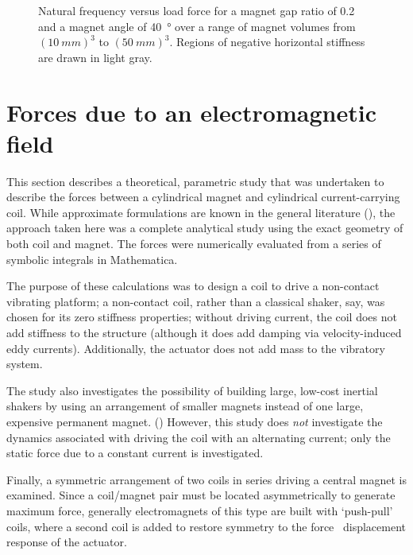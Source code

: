 \begin{figure}
\centering
{}
\caption{Natural frequency versus load force for a magnet gap ratio of \num{0.2} and a magnet angle of \SI{40}{\degree} over a range of magnet volumes from $(\SI{10}{mm})^3$ to $(\SI{50}{mm})^3$. Regions of negative horizontal stiffness are drawn in light gray.}
\end{figure}




\section{Forces due to an electromagnetic field}

This section describes a theoretical, parametric study that was undertaken to
describe the forces between a cylindrical magnet and cylindrical
current-carrying coil. While approximate formulations are known in the general
literature (), the approach taken here was a complete
analytical study using the exact geometry of both coil and magnet. The
forces were numerically evaluated from a series of symbolic integrals in
Mathematica.

The purpose of these calculations was to design a coil to drive a non-contact
vibrating platform; a non-contact coil, rather than a classical shaker, say,
was chosen for its zero stiffness properties; without driving current, the
coil does not add stiffness to the structure (although it does add damping via
velocity-induced eddy currents). Additionally, the actuator does not add mass
to the vibratory system. 

The study also investigates the possibility of building large, low-cost
inertial shakers by using an arrangement of smaller magnets instead of one
large, expensive permanent magnet. () However, this study does \emph{not} investigate the dynamics
associated with driving the coil with an alternating current; only the static
force due to a constant current is investigated.


Finally, a symmetric arrangement of two coils in series driving a central
magnet is examined. Since a coil/magnet pair must be located asymmetrically to
generate maximum force, generally electromagnets of this type are built with
`push-pull' coils, where a second coil is added to restore symmetry to the
force \vs\  displacement response of the actuator.


